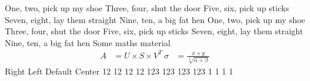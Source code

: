 \markdownRendererInterblockSeparator
{}\markdownRendererUlBegin
\markdownRendererUlItem One, two, pick up my shoe\markdownRendererUlItemEnd 
\markdownRendererUlItem Three, four, shut the door\markdownRendererUlItemEnd 
\markdownRendererUlItem Five, six, pick up sticks\markdownRendererUlItemEnd 
\markdownRendererUlItem Seven, eight, lay them straight\markdownRendererUlItemEnd 
\markdownRendererUlItem Nine, ten, a big fat hen\markdownRendererUlItemEnd 
\markdownRendererUlItem One, two, pick up my shoe\markdownRendererUlItemEnd 
\markdownRendererUlItem Three, four, shut the door\markdownRendererUlItemEnd 
\markdownRendererUlItem Five, six, pick up sticks\markdownRendererUlItemEnd 
\markdownRendererUlItem Seven, eight, lay them straight\markdownRendererUlItemEnd 
\markdownRendererUlItem Nine, ten, a big fat hen\markdownRendererUlItemEnd 
\markdownRendererUlEnd \markdownRendererInterblockSeparator
{}\markdownRendererHorizontalRule{}\markdownRendererInterblockSeparator
{}\markdownRendererInterblockSeparator
{}\markdownRendererUlBegin
\markdownRendererUlItem Some maths material\markdownRendererUlItemEnd 
\markdownRendererUlEnd \markdownRendererInterblockSeparator
{}\begin{align} A &= U \times S \times V^T\ \sigma &= \frac{x\times y}{\sqrt[3]{\alpha + \beta}} \end{align}\markdownRendererInterblockSeparator
{}\markdownRendererHorizontalRule{}\markdownRendererInterblockSeparator
{}\markdownRendererInterblockSeparator
{}%
{{Right}%
{Left}%
{Default}%
{Center}%
}%
{{12}%
{12}%
{12}%
{12}%
}%
{{123}%
{123}%
{123}%
{123}%
}%
{{1}%
{1}%
{1}%
{1}%
}%
\markdownRendererInterblockSeparator
{}\markdownRendererHorizontalRule{}\relax